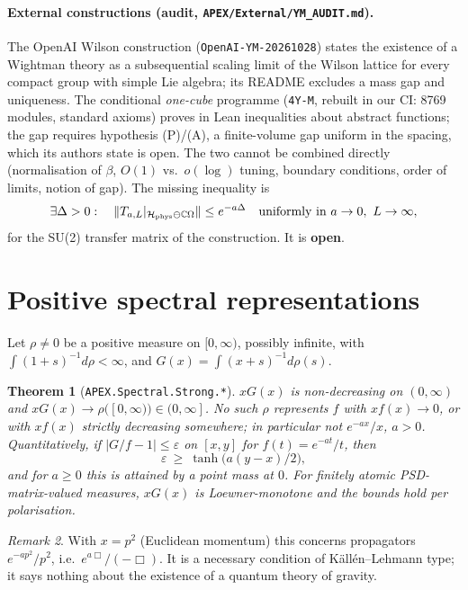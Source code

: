 \documentclass[11pt]{article}
\newtheorem{theorem}{Theorem}
\theoremstyle{remark}\newtheorem{remark}[theorem]{Remark}
\begin{document}
\paragraph{External constructions (audit, \texttt{APEX/External/YM\_AUDIT.md}).}
The OpenAI Wilson construction (\texttt{OpenAI-YM-20261028}) states the existence of a Wightman theory as a subsequential scaling limit of the Wilson lattice for every compact group with simple Lie algebra; its README excludes a mass gap and uniqueness. The conditional \emph{one-cube} programme (\texttt{4Y-M}, rebuilt in our CI: 8769 modules, standard axioms) proves in Lean inequalities about abstract functions; the gap requires hypothesis (P)/(A), a finite-volume gap uniform in the spacing, which its authors state is open. The two cannot be combined directly (normalisation of $\beta$, $O(1)$ vs.\ $o(\log)$ tuning, boundary conditions, order of limits, notion of gap). The missing inequality is
\[\exists\Delta>0:\quad \|T_{a,L}|_{\mathcal H_{\rm phys}\ominus\mathbb C\Omega}\|\le e^{-a\Delta}\quad\text{uniformly in }a\to0,\ L\to\infty,\]
for the SU(2) transfer matrix of the construction. It is \textbf{open}.

\section{Positive spectral representations}
Let $\rho\ne0$ be a positive measure on $[0,\infty)$, possibly infinite, with $\int(1+s)^{-1}d\rho<\infty$, and $G(x)=\int(x+s)^{-1}d\rho(s)$.
\begin{theorem}[\texttt{APEX.Spectral.Strong.*}]
$xG(x)$ is non-decreasing on $(0,\infty)$ and $xG(x)\to\rho([0,\infty))\in(0,\infty]$. No such $\rho$ represents $f$ with $xf(x)\to0$, or with $xf(x)$ strictly decreasing somewhere; in particular not $e^{-ax}/x$, $a>0$. Quantitatively, if $|G/f-1|\le\varepsilon$ on $[x,y]$ for $f(t)=e^{-at}/t$, then
\[\varepsilon\ \ge\ \tanh\bigl(a(y-x)/2\bigr),\]
and for $a\ge0$ this is attained by a point mass at $0$. For finitely atomic PSD-matrix-valued measures, $xG(x)$ is Loewner-monotone and the bounds hold per polarisation.
\end{theorem}
\begin{remark}
With $x=p^2$ (Euclidean momentum) this concerns propagators $e^{-ap^2}/p^2$, i.e.\ $e^{a\Box}/(-\Box)$. It is a necessary condition of K\"all\'en--Lehmann type; it says nothing about the existence of a quantum theory of gravity.
\end{remark}
\end{document}
